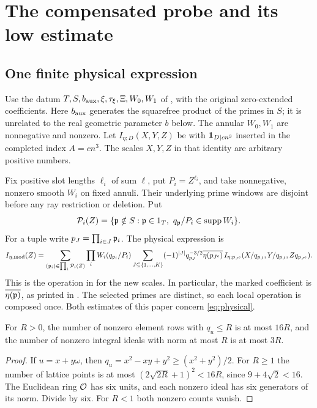 \section{The compensated probe and its low estimate}\label{sec:low}
\subsection{One finite physical expression}
Use the datum $T,S,b_{\rm aux},\xi,\tau_\xi,\Xi,W_0,W_1$ of , with the original zero-extended coefficients. Here $b_{\rm aux}$ generates the squarefree product of the primes in $S$; it is unrelated to the real geometric parameter $b$ below. The annular $W_0,W_1$ are nonnegative and nonzero. Let $I_{\eta;D}(X,Y,Z)$ be  with $\mathbf 1_{D\mid cn^3}$ inserted in the completed index $A=cn^3$. The scales $X,Y,Z$ in that identity are arbitrary positive numbers.

Fix positive slot lengths $\ell_i$ of sum $\ell$, put $P_i=Z^{\ell_i}$, and take nonnegative, nonzero smooth $W_i$ on fixed annuli. Their underlying prime windows are disjoint before any ray restriction or deletion. Put
\[
 \mathcal P_i(Z)=\{\mathfrak p\notin S:\mathfrak p\in1_T,\ q_\mathfrak p/P_i\in\operatorname{supp} W_i\}.
\]
For a tuple write $p_J=\prod_{i\in J}\mathfrak p_i$. The physical expression is
\begin{equation}\label{eq:physical}
\begin{split}
 I_{\eta,{\rm mod}}(Z)=\sum_{(\mathfrak p_i)\in\prod_i\mathcal P_i(Z)}
 \prod_i W_i(q_{\mathfrak p_i}/P_i)
 \sum_{J\subseteq\{1,\ldots,K\}}(-1)^{|J|}q_{p_J}^{-3/2}
 \overline{\eta(p_{J^c})}\,
 I_{\eta;p_{J^c}}(X/q_{p_J},Y/q_{p_J},Zq_{p_{J^c}}).
\end{split}
\end{equation}
This is the operation in  for the new scales. In particular, the marked coefficient is $\overline{\eta(\mathfrak p)}$, as printed in . The selected primes are distinct, so each local operation is composed once. Both estimates of this paper concern \eqref{eq:physical}.

\begin{lemma}\label{lem:countlattice}
For $R>0$, the number of nonzero element rows with $q_u\le R$ is at most $16R$, and the number of nonzero integral ideals with norm at most $R$ is at most $3R$.
\end{lemma}
\begin{proof}
If $u=x+y\omega$, then $q_u=x^2-xy+y^2\ge(x^2+y^2)/2$. For $R\ge1$ the number of lattice points is at most $(2\sqrt{2R}+1)^2<16R$, since $9+4\sqrt2<16$. The Euclidean ring $\mathcal O$ has six units, and each nonzero ideal has six generators of its norm. Divide by six. For $R<1$ both nonzero counts vanish.
\end{proof}

